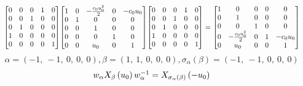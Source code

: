 \documentclass[11pt]{article}
\theoremstyle{definition}
\begin{document}
\[
\scaletoalign{\textwidth}{{\left[\begin{matrix}0 & 0 & 0 & 1 & 0\\0 & 0 & 1 & 0 & 0\\0 & 1 & 0 & 0 & 0\\1 & 0 & 0 & 0 & 0\\0 & 0 & 0 & 0 & 1\end{matrix}\right]} {\left[\begin{matrix}1 & 0 & - \frac{c_{0} u_{0}^{2}}{2} & 0 & - c_{0} u_{0}\\0 & 1 & 0 & 0 & 0\\0 & 0 & 1 & 0 & 0\\0 & 0 & 0 & 1 & 0\\0 & 0 & u_{0} & 0 & 1\end{matrix}\right]} {\left[\begin{matrix}0 & 0 & 0 & 1 & 0\\0 & 0 & 1 & 0 & 0\\0 & 1 & 0 & 0 & 0\\1 & 0 & 0 & 0 & 0\\0 & 0 & 0 & 0 & 1\end{matrix}\right]} = {\left[\begin{matrix}1 & 0 & 0 & 0 & 0\\0 & 1 & 0 & 0 & 0\\0 & 0 & 1 & 0 & 0\\0 & - \frac{c_{0} u_{0}^{2}}{2} & 0 & 1 & - c_{0} u_{0}\\0 & u_{0} & 0 & 0 & 1\end{matrix}\right]}}
\]
\[
\alpha = \left( -1, \  -1, \  0, \  0, \  0\right), \beta = \left( 1, \  1, \  0, \  0, \  0\right), \sigma_{\alpha}(\beta) = \left( -1, \  -1, \  0, \  0, \  0\right)
\]
\[
\scaletoalign{\textwidth}{w_{\alpha} X_{\beta}\left(u_{0}\right) w_{\alpha}^{-1} = X_{\sigma_{\alpha}\left(\beta\right)}\left(- u_{0}\right)}
\]
\end{document}
